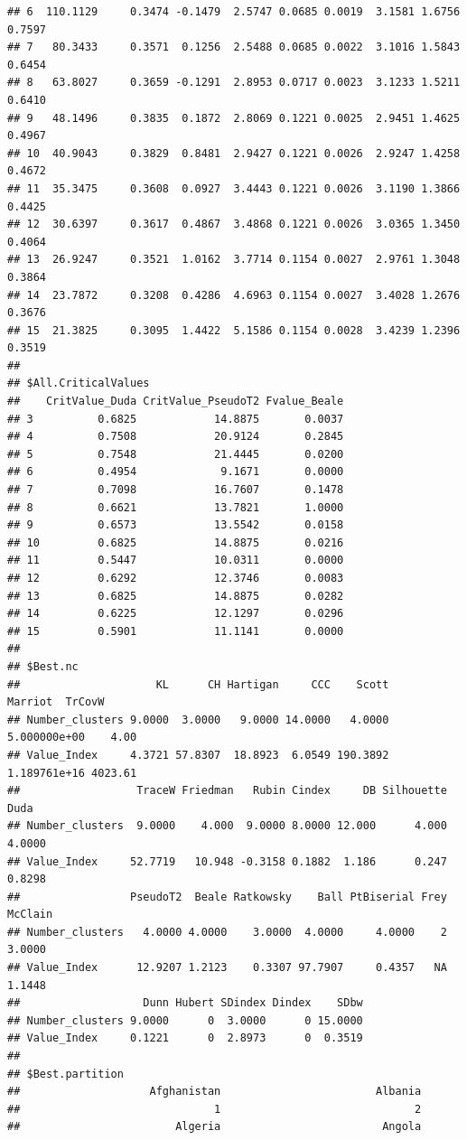 \documentclass[
]{article}
\begin{document}
\begin{verbatim}
## 6  110.1129     0.3474 -0.1479  2.5747 0.0685 0.0019  3.1581 1.6756 0.7597
## 7   80.3433     0.3571  0.1256  2.5488 0.0685 0.0022  3.1016 1.5843 0.6454
## 8   63.8027     0.3659 -0.1291  2.8953 0.0717 0.0023  3.1233 1.5211 0.6410
## 9   48.1496     0.3835  0.1872  2.8069 0.1221 0.0025  2.9451 1.4625 0.4967
## 10  40.9043     0.3829  0.8481  2.9427 0.1221 0.0026  2.9247 1.4258 0.4672
## 11  35.3475     0.3608  0.0927  3.4443 0.1221 0.0026  3.1190 1.3866 0.4425
## 12  30.6397     0.3617  0.4867  3.4868 0.1221 0.0026  3.0365 1.3450 0.4064
## 13  26.9247     0.3521  1.0162  3.7714 0.1154 0.0027  2.9761 1.3048 0.3864
## 14  23.7872     0.3208  0.4286  4.6963 0.1154 0.0027  3.4028 1.2676 0.3676
## 15  21.3825     0.3095  1.4422  5.1586 0.1154 0.0028  3.4239 1.2396 0.3519
## 
## $All.CriticalValues
##    CritValue_Duda CritValue_PseudoT2 Fvalue_Beale
## 3          0.6825            14.8875       0.0037
## 4          0.7508            20.9124       0.2845
## 5          0.7548            21.4445       0.0200
## 6          0.4954             9.1671       0.0000
## 7          0.7098            16.7607       0.1478
## 8          0.6621            13.7821       1.0000
## 9          0.6573            13.5542       0.0158
## 10         0.6825            14.8875       0.0216
## 11         0.5447            10.0311       0.0000
## 12         0.6292            12.3746       0.0083
## 13         0.6825            14.8875       0.0282
## 14         0.6225            12.1297       0.0296
## 15         0.5901            11.1141       0.0000
## 
## $Best.nc
##                     KL      CH Hartigan     CCC    Scott      Marriot  TrCovW
## Number_clusters 9.0000  3.0000   9.0000 14.0000   4.0000 5.000000e+00    4.00
## Value_Index     4.3721 57.8307  18.8923  6.0549 190.3892 1.189761e+16 4023.61
##                  TraceW Friedman   Rubin Cindex     DB Silhouette   Duda
## Number_clusters  9.0000    4.000  9.0000 8.0000 12.000      4.000 4.0000
## Value_Index     52.7719   10.948 -0.3158 0.1882  1.186      0.247 0.8298
##                 PseudoT2  Beale Ratkowsky    Ball PtBiserial Frey McClain
## Number_clusters   4.0000 4.0000    3.0000  4.0000     4.0000    2  3.0000
## Value_Index      12.9207 1.2123    0.3307 97.7907     0.4357   NA  1.1448
##                   Dunn Hubert SDindex Dindex    SDbw
## Number_clusters 9.0000      0  3.0000      0 15.0000
## Value_Index     0.1221      0  2.8973      0  0.3519
## 
## $Best.partition
##                    Afghanistan                        Albania 
##                              1                              2 
##                        Algeria                         Angola 

\end{verbatim}
\end{document}
